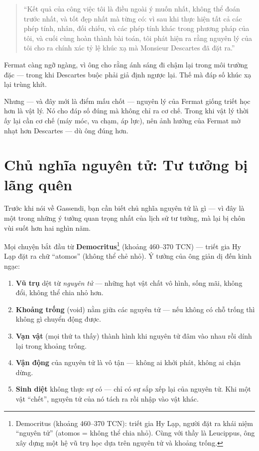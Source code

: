 \begin{quote}
“Kết quả của công việc tôi là điều ngoài ý muốn nhất, không thể đoán trước nhất, và tốt đẹp nhất mà từng có: vì sau khi thực hiện tất cả các phép tính, nhân, đối chiếu, và các phép tính khác trong phương pháp của tôi, và cuối cùng hoàn thành bài toán, tôi phát hiện ra rằng nguyên lý của tôi cho ra chính xác tỷ lệ khúc xạ mà Monsieur Descartes đã đặt ra.”
\end{quote}

Fermat càng ngỡ ngàng, vì ông cho rằng ánh sáng đi chậm lại trong môi trường đặc — trong khi Descartes buộc phải giả định ngược lại. Thế mà đáp số khúc xạ lại trùng khít.

Nhưng — và đây mới là điểm mấu chốt — nguyên lý của Fermat giống triết học hơn là vật lý. Nó cho đáp số đúng mà không chỉ ra cơ chế. Trong khi vật lý thời ấy lại cần cơ chế (máy móc, va chạm, áp lực), nên ảnh hưởng của Fermat mờ nhạt hơn Descartes — dù ông đúng hơn.


\section{Chủ nghĩa nguyên tử: Tư tưởng bị lãng quên}

Trước khi nói về Gassendi, bạn cần biết chủ nghĩa nguyên tử là gì — vì đây là một trong những ý tưởng quan trọng nhất của lịch sử tư tưởng, mà lại bị chôn vùi suốt hơn hai nghìn năm.

Mọi chuyện bắt đầu từ \textbf{Democritus}\footnote{Democritus (khoảng 460--370 TCN): triết gia Hy Lạp, người đặt ra khái niệm “nguyên tử” (atomos = không thể chia nhỏ). Cùng với thầy là Leucippus, ông xây dựng một hệ vũ trụ học dựa trên nguyên tử và khoảng trống.} (khoảng 460--370 TCN) — triết gia Hy Lạp đặt ra chữ “atomos” (không thể chẻ nhỏ). Ý tưởng của ông giản dị đến kinh ngạc:

\begin{enumerate}
  \item \textbf{Vũ trụ} dệt từ \emph{nguyên tử} — những hạt vật chất vô hình, sống mãi, không đổi, không thể chia nhỏ hơn.
  \item \textbf{Khoảng trống} (void) nằm giữa các nguyên tử — nếu không có chỗ trống thì không gì chuyển động được.
  \item \textbf{Vạn vật} (mọi thứ ta thấy) thành hình khi nguyên tử đâm vào nhau rồi dính lại trong khoảng trống.
  \item \textbf{Vận động} của nguyên tử là vô tận — không ai khởi phát, không ai chặn dừng.
  \item \textbf{Sinh diệt} không thực sự có — chỉ có sự sắp xếp lại của nguyên tử. Khi một vật “chết”, nguyên tử của nó tách ra rồi nhập vào vật khác.
\end{enumerate}

